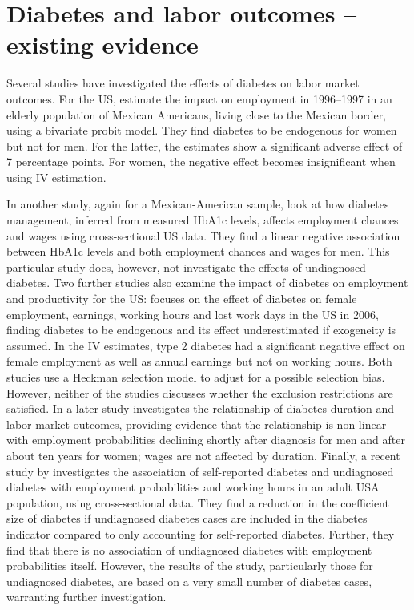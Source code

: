 \documentclass[12pt,english,british]{article}
\begin{document}
\section{\label{sec:Labor  outcomes and diabetes literature} Diabetes and labor outcomes -- existing evidence }

Several studies have investigated the effects of diabetes on labor market outcomes. For the US, \citet{Brown2005} estimate  the impact on employment in 1996--1997 in an elderly population of Mexican Americans, living close to the Mexican border, using a bivariate probit model. They find diabetes to be endogenous for women but not for men.  For the latter, the estimates show a significant adverse effect of 7 percentage points. For women, the negative effect becomes insignificant when using IV estimation. 

In another study, again for a Mexican-American sample, \citet{BrownIII2011} look at how diabetes management, inferred from measured \ac{HbA1c} levels, affects employment chances and wages using cross-sectional US data. They find a linear negative association between \ac{HbA1c} levels and both employment chances and wages for men. This particular study does, however, not investigate the effects of undiagnosed diabetes. Two further studies also examine the impact of diabetes on employment and productivity for the US: \citet{Minor2010} focuses on the effect of diabetes on female employment, earnings, working hours and lost work days in the \ac{US} in 2006, finding diabetes to be endogenous and its effect underestimated if exogeneity is assumed. In the \ac{IV} estimates, type 2 diabetes had a significant negative effect on female employment as well as annual earnings but not on working hours. Both studies use a Heckman selection model to adjust for a possible selection bias. However, neither of the studies discusses whether the exclusion restrictions are satisfied. In a later study \citet{Minor2013} investigates the relationship of diabetes duration and labor market outcomes, providing evidence that the relationship is non-linear with employment probabilities declining shortly after diagnosis for men and after about ten years for women; wages are not affected by duration. Finally, a recent study by \citep{Minor2015} investigates the association of self-reported diabetes and undiagnosed diabetes with employment probabilities and working hours in an adult USA population, using cross-sectional data. They find a reduction in the coefficient size of diabetes if undiagnosed diabetes cases are included in the diabetes indicator compared to only accounting for self-reported diabetes. Further, they find that there is no association of undiagnosed diabetes with employment probabilities itself. However, the results of the study, particularly those for undiagnosed diabetes, are based on a very small number of diabetes cases, warranting further investigation.
\end{document}
